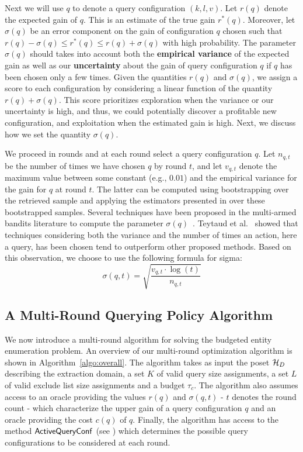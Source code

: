 Next we will use $q$ to denote a query configuration $(k,l,v)$. Let $r(q)$ denote the expected gain of $q$. This is an estimate of the true gain $r^*(q)$. Moreover, let $\sigma(q)$ be an error component on the gain of configuration $q$ chosen such that $r(q) - \sigma(q) \leq r^*(q) \leq r(q) + \sigma(q)$ with high probability. The parameter $\sigma(q)$ should takes into account both the {\bf empirical variance} of the expected gain as well as our {\bf uncertainty} about the gain of query configuration $q$ if $q$ has been chosen only a few times. Given the quantities $r(q)$ and $\sigma(q)$, we assign a score to each configuration by considering a linear function of the quantity $r(q) + \sigma(q)$. This score prioritizes exploration when the variance or our uncertainty is high, and thus, we could potentially discover a profitable new configuration, and exploitation when the estimated gain is high. Next, we discuss how we set the quantity $\sigma(q)$.

We proceed in rounds and at each round select a query configuration $q$. Let $n_{q,t}$ be the number of times we have chosen $q$ by round $t$, and let $v_{q,t}$ denote the maximum value between some constant (e.g., $0.01$) and the empirical variance for the gain for $q$ at round $t$. The latter can be computed using bootstrapping over the retrieved sample and applying the estimators presented in  over these bootstrapped samples. Several techniques have been proposed in the multi-armed bandits literature to compute the parameter $\sigma(q)$~\cite{teytaud:inria-00173263}. Teytaud et al.~\cite{teytaud:inria-00173263} showed that techniques considering both the variance and the number of times an action, here a query, has been chosen tend to outperform other proposed methods. Based on this observation, we choose to use the following formula for sigma:
\begin{equation}
\label{eq:upper}
\sigma(q,t) = \sqrt{\frac{v_{q,t}\cdot\log(t)}{n_{q,t}}}
\end{equation}

\subsection{A Multi-Round Querying Policy Algorithm}
\label{sec:heuristic}
We now introduce a multi-round algorithm for solving the budgeted entity enumeration problem. An overview of our multi-round optimization algorithm is shown in Algorithm~\ref{algo:overall}. The algorithm takes as input the poset $\mathcal{H}_D$ describing the extraction domain, a set $K$ of valid query size assignments, a set $L$ of valid exclude list size assignments and a budget $\tau_c$. The algorithm also assumes access to an oracle providing the values $r(q)$ and $\sigma(q,t)$ - $t$ denotes the round count -  which characterize the upper gain of a query configuration $q$ and an oracle providing the cost $c(q)$ of $q$. Finally, the algorithm has access to the method ${\sf ActiveQueryConf}$ (see ) which determines the possible query configurations to be considered at each round.

